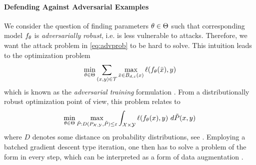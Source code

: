 \paragraph{Defending Against Adversarial Examples}
%
%
We consider the question of finding parameters $\theta\in\Theta$ such that corresponding model $f_\theta$ is \emph{adversarially robust}, i.e. is less vulnerable to attacks. Therefore, we want the attack problem in \cref{eq:advprob} to be hard to solve. This intuition leads to the optimization problem
%
\begin{align*}
\min_{\theta\in\Theta} \sum_{(x,y)\in \mathcal{T}} \max_{\bar{x}\in B_{d,\varepsilon}(x)} \ell(f_\theta(\bar{x}), y)
\end{align*}
%
which is known as the \emph{adversarial training} formulation \cite{kurakin2016adversarial2, madry2017towards}. From a distributionally robust optimization point of view, this problem relates to 
%
\begin{align*}
\min_{\param\in\Param} \max_{\tilde P: D(P_{\Inp,\Oup}, \tilde P)\leq\budget} \int_{\Inp\times\Oup} \ell(\net_\param(\inp), \oup)\ d\tilde{P}(\inp,\oup)
\end{align*}
%
where $D$ denotes some distance on probability distributions, see \cite{bungert2023geometry}. Employing a batched gradient descent type iteration, one then has to solve a problem of the form  in every step, which can be interpreted as a form of data augmentation \cite{lecun1995learning}. 
%
%
%
